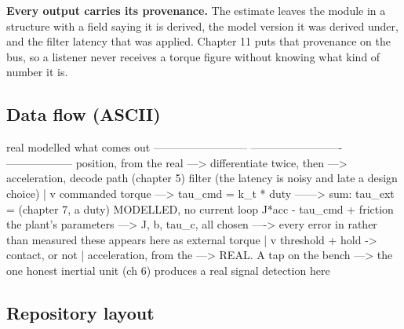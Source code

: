\textbf{Every output carries its provenance.} The estimate leaves the module in
a structure with a field saying it is derived, the model version it was derived
under, and the filter latency that was applied. Chapter 11 puts that provenance
on the bus, so a listener never receives a torque figure without knowing what
kind of number it is.

\subsection*{Data flow (ASCII)}

\begin{asciiart}
  real                          modelled                      what comes out
  --------------------------    -------------------------     ------------------
  position, from the real  ---> differentiate twice, then ---> acceleration,
  decode path (chapter 5)       filter (the latency is         noisy and late
                                a design choice)                    |
                                                                    v
  commanded torque         ---> tau_cmd = k_t * duty ------> sum:  tau_ext =
  (chapter 7, a duty)           MODELLED, no current loop     J*acc - tau_cmd
                                                                  + friction
  the plant's parameters   ---> J, b, tau_c, all chosen ----> every error in
                                rather than measured          these appears here
                                                              as external torque
                                                                    |
                                                                    v
                                                              threshold + hold
                                                              -> contact, or not
                                                                    |
  acceleration, from the   ---> REAL. A tap on the bench  ---> the one honest
  inertial unit (ch 6)          produces a real signal          detection here
\end{asciiart}

\subsection*{Repository layout}


